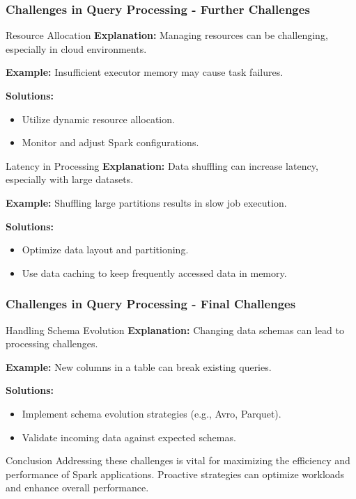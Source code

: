 \documentclass[aspectratio=169]{beamer}
\begin{document}
\begin{frame}[fragile]
    \frametitle{Challenges in Query Processing - Further Challenges}
    \begin{block}{Resource Allocation}
        \textbf{Explanation:} Managing resources can be challenging, especially in cloud environments.
        
        \textbf{Example:} Insufficient executor memory may cause task failures.
        
        \textbf{Solutions:}
        \begin{itemize}
            \item Utilize dynamic resource allocation.
            \item Monitor and adjust Spark configurations.
        \end{itemize}
    \end{block}

    \begin{block}{Latency in Processing}
        \textbf{Explanation:} Data shuffling can increase latency, especially with large datasets.
        
        \textbf{Example:} Shuffling large partitions results in slow job execution.
        
        \textbf{Solutions:}
        \begin{itemize}
            \item Optimize data layout and partitioning.
            \item Use data caching to keep frequently accessed data in memory.
        \end{itemize}
    \end{block}
\end{frame}

\begin{frame}[fragile]
    \frametitle{Challenges in Query Processing - Final Challenges}
    \begin{block}{Handling Schema Evolution}
        \textbf{Explanation:} Changing data schemas can lead to processing challenges.
        
        \textbf{Example:} New columns in a table can break existing queries.
        
        \textbf{Solutions:}
        \begin{itemize}
            \item Implement schema evolution strategies (e.g., Avro, Parquet).
            \item Validate incoming data against expected schemas.
        \end{itemize}
    \end{block}

    \begin{block}{Conclusion}
        Addressing these challenges is vital for maximizing the efficiency and performance of Spark applications. Proactive strategies can optimize workloads and enhance overall performance.
    \end{block}
\end{frame}
\end{document}
